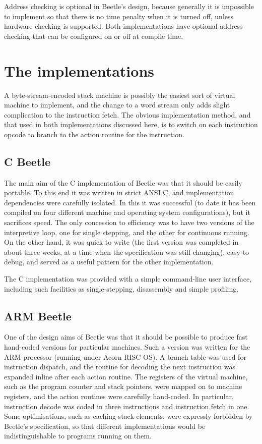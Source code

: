 \documentclass{article}
\begin{document}
Address checking is optional in Beetle's design, because generally it is
impossible to implement so that there is no time penalty when it is turned
off, unless hardware checking is supported. Both implementations have
optional address checking that can be configured on or off at compile time.


\section{The implementations}

A byte-stream-encoded stack machine is possibly the easiest sort of virtual
machine to implement, and the change to a word stream only adds slight
complication to the instruction fetch. The obvious implementation method, and
that used in both implementations discussed here, is to switch on each
instruction opcode to branch to the action routine for the instruction.

\subsection{C Beetle}

The main aim of the C implementation of Beetle was that it should be easily
portable. To this end it was written in strict ANSI C, and implementation
dependencies were carefully isolated. In this it was successful (to date it
has been compiled on four different machine and operating system
configurations), but it sacrifices speed. The only concession to efficiency
was to have two versions of the interpretive loop, one for single stepping,
and the other for continuous running. On the other hand, it was quick to
write (the first version was completed in about three weeks, at a time when
the specification was still changing), easy to debug, and served as a useful
pattern for the other implementation.

The C implementation was provided with a simple command-line user interface,
including such facilities as single-stepping, disassembly and simple
profiling.

\subsection{ARM Beetle}

One of the design aims of Beetle was that it should be possible to produce
fast hand-coded versions for particular machines. Such a version was written
for the ARM processor (running under Acorn RISC OS). A branch table was used
for instruction dispatch, and the routine for decoding the next instruction
was expanded inline after each action routine. The registers of the virtual
machine, such as the program counter and stack pointers, were mapped on to
machine registers, and the action routines were carefully hand-coded. In
particular, instruction decode was coded in three instructions and
instruction fetch in one. Some optimisations, such as caching stack elements,
were expressly forbidden by Beetle's specification, so that different
implementations would be indistinguishable to programs running on them.
\end{document}
